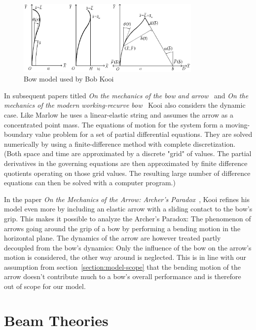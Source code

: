 \begin{figure}[h]
\centering
\includegraphics[width=0.8\textwidth]{figures/model/kooi}
\caption{Bow model used by Bob Kooi \cite{bib:kosp80}}
\label{fig:model:kooi}
\end{figure}

In subsequent papers titled \textit{On the mechanics of the bow and arrow}~\cite{bib:kooi81} and \textit{On the mechanics of the modern working-recurve bow}~\cite{bib:kooi91} Kooi also considers the dynamic case. Like Marlow he uses a linear-elastic string and assumes the arrow as a concentrated point mass. The equations of motion for the system form a moving-boundary value problem for a set of partial differential equations. They are solved numerically by using a finite-difference method with complete discretization. (Both space and time are approximated by a discrete "grid" of values. The partial derivatives in the governing equations are then approximated by finite difference quotients operating on those grid values. The resulting large number of difference equations can then be solved with a computer program.)

In the paper \textit{On the Mechanics of the Arrow: Archer's Paradox}~\cite{bib:kosp97}, Kooi refines his model even more by including an elastic arrow with a sliding contact to the bow's grip. This makes it possible to analyze the Archer's Paradox: The phenomenon of arrows going around the grip of a bow by performing a bending motion in the horizontal plane. The dynamics of the arrow are however treated partly decoupled from the bow's dynamics: Only the influence of the bow on the arrow's motion is considered, the other way around is neglected. This is in line with our assumption from section~\ref{section:model-scope} that the bending motion of the arrow doesn't contribute much to a bow's overall performance and is therefore out of scope for our model.

\newpage
\section{Beam Theories}

